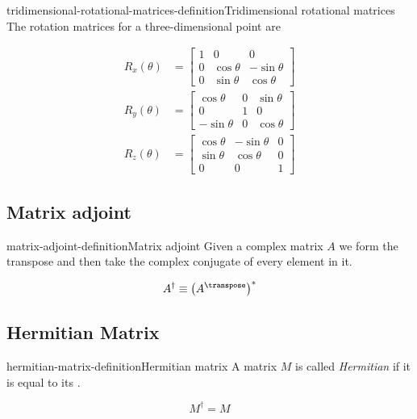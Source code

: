 \documentclass[preview]{standalone}
\begin{document}
\begin{snippetdefinition}{tridimensional-rotational-matrices-definition}{Tridimensional rotational matrices}
    The rotation matrices for a three-dimensional point are

    \begin{align*}
        R_x(\theta)&=
        \begin{bmatrix} 
            1 & 0 & 0 \\
            0 & \cos\theta & -\sin\theta \\
            0 & \sin\theta & \cos\theta
        \end{bmatrix}
        \\
        R_y(\theta)&=
        \begin{bmatrix} 
            \cos\theta & 0 & \sin\theta \\
            0 & 1 & 0 \\
            -\sin\theta & 0 & \cos\theta
        \end{bmatrix}
        \\
        R_z(\theta)&=
        \begin{bmatrix} 
            \cos\theta & -\sin\theta & 0 \\
            \sin\theta & \cos\theta & 0 \\
            0 & 0 & 1
        \end{bmatrix}
    \end{align*}
\end{snippetdefinition}

\subsection{Matrix adjoint}

\begin{snippetdefinition}{matrix-adjoint-definition}{Matrix adjoint}
    Given a complex matrix \(A\) we form the transpose and then take the complex conjugate of every element in it.

    \[
        A^\dagger \equiv {\left(A^\transpose\right)}^{*}
    \]
\end{snippetdefinition}

\subsection{Hermitian Matrix}

\begin{snippetdefinition}{hermitian-matrix-definition}{Hermitian matrix}
    A matrix \(M\) is called \textit{Hermitian} if it is equal to its .

    \[
        M^\dagger = M
    \]
\end{snippetdefinition}
\end{document}
